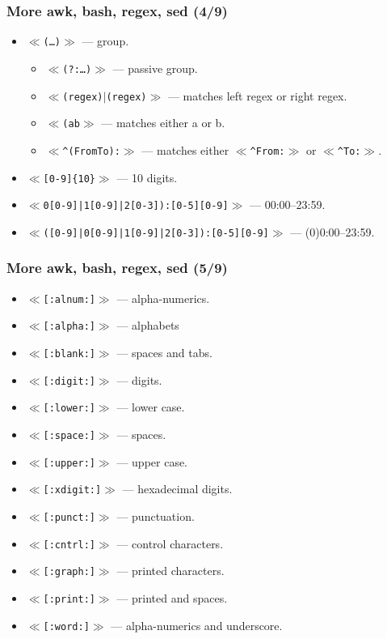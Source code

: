 \documentclass[aspectratio=169, xcolor=table, notheorems, hyperref={pdfpagelabels=false}]{beamer}
\begin{document}
\begin{frame}[fragile]
\frametitle{More awk, bash, regex, sed (4/9)}
\begin{itemize}
\item $\ll$\texttt{(\ldots)}$\gg$ --- group.
\begin{itemize}
\item $\ll$\texttt{(?:\ldots)}$\gg$ --- passive group.
\item $\ll$\texttt{(regex)$\mid$(regex)}$\gg$ --- matches left regex or right regex.
\item $\ll$\texttt{(a\textbar{}b}$\gg$ --- matches either a or b.
\item $\ll$\texttt{\^{}(From\textbar{}To):}$\gg$ --- matches either $\ll$\texttt{\^{}From:}$\gg$ or
      $\ll$\texttt{\^{}To:}$\gg$.
\end{itemize}
\item $\ll$\texttt{[0-9]\{10\}}$\gg$ --- 10 digits.
\item $\ll$\texttt{0[0-9]|1[0-9]|2[0-3]):[0-5][0-9]}$\gg$ --- 00:00--23:59.
\item $\ll$\texttt{([0-9]|0[0-9]|1[0-9]|2[0-3]):[0-5][0-9]}$\gg$ --- (0)0:00--23:59.
\end{itemize}
\end{frame}


\begin{frame}[fragile]
\frametitle{More awk, bash, regex, sed (5/9)}
\begin{itemize}
\item $\ll$\texttt{[:alnum:]}$\gg$ --- alpha-numerics.
\item $\ll$\texttt{[:alpha:]}$\gg$ --- alphabets
\item $\ll$\texttt{[:blank:]}$\gg$ --- spaces and tabs.
\item $\ll$\texttt{[:digit:]}$\gg$ --- digits.
\item $\ll$\texttt{[:lower:]}$\gg$ --- lower case.
\item $\ll$\texttt{[:space:]}$\gg$ --- spaces.
\item $\ll$\texttt{[:upper:]}$\gg$ --- upper case.
\item $\ll$\texttt{[:xdigit:]}$\gg$ --- hexadecimal digits.
\item $\ll$\texttt{[:punct:]}$\gg$ --- punctuation.
\item $\ll$\texttt{[:cntrl:]}$\gg$ --- control characters.
\item $\ll$\texttt{[:graph:]}$\gg$ --- printed characters.
\item $\ll$\texttt{[:print:]}$\gg$ --- printed and spaces.
\item $\ll$\texttt{[:word:]}$\gg$ --- alpha-numerics and underscore.
\end{itemize}
\end{frame}
\end{document}

